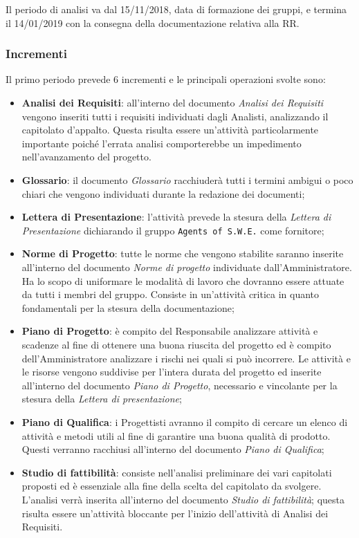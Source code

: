 Il periodo di analisi va dal 15/11/2018, data di formazione dei gruppi, e termina il 14/01/2019 con la consegna della documentazione relativa alla RR.

\subsubsection{Incrementi}

Il primo periodo prevede 6 incrementi e le principali operazioni svolte sono: 
\begin{itemize}
	\item \textbf{Analisi dei Requisiti}: all'interno del documento \textit{Analisi dei Requisiti} vengono inseriti tutti i requisiti individuati dagli Analisti, analizzando il capitolato d'appalto. Questa risulta essere un'attività particolarmente importante poiché l'errata analisi comporterebbe un impedimento nell'avanzamento del progetto.
	\item \textbf{Glossario}: il documento \textit{Glossario} racchiuderà tutti i termini ambigui o poco chiari che vengono individuati durante la redazione dei documenti;
	\item \textbf{Lettera di Presentazione}: l'attività prevede la stesura della \textit{Lettera di Presentazione} dichiarando il gruppo \texttt{Agents of S.W.E.} come fornitore;
	\item \textbf{Norme di Progetto}: tutte le norme che vengono stabilite saranno inserite all'interno del documento \textit{Norme di progetto} individuate dall'Amministratore. Ha lo scopo di uniformare le modalità di lavoro che dovranno essere attuate da tutti i membri del gruppo. Consiste in un'attività critica in quanto fondamentali per la stesura della documentazione;
	\item \textbf{Piano di Progetto}: è compito del Responsabile analizzare attività e scadenze al fine di ottenere una buona riuscita del progetto ed è compito dell'Amministratore analizzare i rischi nei quali si può incorrere. Le attività e le risorse vengono suddivise per l'intera durata del progetto ed inserite all'interno del documento \textit{Piano di Progetto}, necessario e vincolante per la stesura della \textit{Lettera di presentazione};
	\item \textbf{Piano di Qualifica}: i Progettisti avranno il compito di cercare un elenco di attività e metodi utili al fine di garantire una buona qualità di prodotto. Questi verranno racchiusi all'interno del documento \textit{Piano di Qualifica};
	\item \textbf{Studio di fattibilità}: consiste nell'analisi preliminare dei vari capitolati proposti ed è essenziale alla fine della scelta del capitolato da svolgere. L'analisi verrà inserita all'interno del documento \textit{Studio di fattibilità}; questa risulta essere un'attività bloccante per l'inizio dell'attività di Analisi dei Requisiti.  
\end{itemize}

